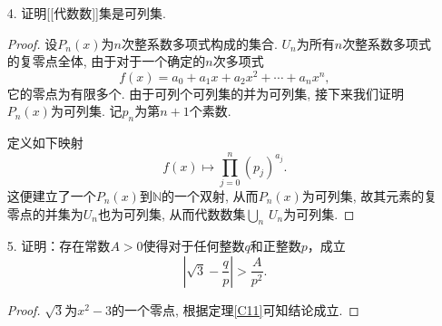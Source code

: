 \begin{1a}
\begin{enumerate}
\begin{proof}
下证\(n_1\ne n_2\,,m_1\ne m_2\)的情形. 不失一般性, 我们设\(n_1>n_2\). 
此时, 若\(T(q_1)=T(q_2)\)即\[(m_1+n_1)^2+n_1=(m_2+n_2)^2+n_2,\]
必有\(m_1+n_1<m_2+n_2\). 设\(t=m_1+n_1\), 得到
\[m_2+n_2=t+[(m_2+n_2)-(m_1+n_1)]:=t+k.\]
显然\(k>1,t>n_1\), 于是\[\begin{split}
    (m_2+n_2)^2-(m_1+n_1)^2-n_1&=(t+k)^2-t^2-n_1\\
    &=k^2+2kt-n_1>0.
\end{split}\]
即若\((m_2+n_2)^2>(m_1+n_1)^2\)必有\[(m_2+n_2)^2>(m_1+n_1)^2+n_1,\]
可见此时不可能有\(T(q_1)=T(q_2)\). \(q<0\)的情况可类似说明.
\end{proof}
\item[4.] 证明[[代数数]]集是可列集.
\begin{proof}
设\(P_n(x)\)为\(n\)次整系数多项式构成的集合. 
\(U_n\)为所有\(n\)次整系数多项式的复零点全体, 由于对于一个确定的\(n\)次多项式
\[f(x)=a_0+a_1x+a_2x^2+\cdots+a_nx^n,\]
它的零点为有限多个. 由于可列个可列集的并为可列集, 接下来我们证明\(P_n(x)\)为可列集. 记\(p_n\)为第\(n+1\)个素数.

定义如下映射\[f(x)\mapsto\prod_{j=0}^{n}\left(p_j\right)^{a_j}.\]
这便建立了一个\(P_n(x)\)到\(\mathbb{N}\)的一个双射, 
从而\(P_n(x)\)为可列集, 故其元素的复零点的并集为\(U_n\)也为可列集, 
从而代数数集\(\underset{n}{\bigcup}\,U_n\)为可列集.
\end{proof}
\item[5.] 证明：存在常数\(A>0\)使得对于任何整数\(q\)和正整数\(p\)，成立
\[\left|\sqrt{3}-\frac{q}{p}\right|>\frac{A}{p^2}.\]
\begin{proof}
\(\sqrt{3}\)为\(x^2-3\)的一个零点, 根据定理\ref{C11}可知结论成立.
\end{proof}
\end{enumerate}
\end{1a}
